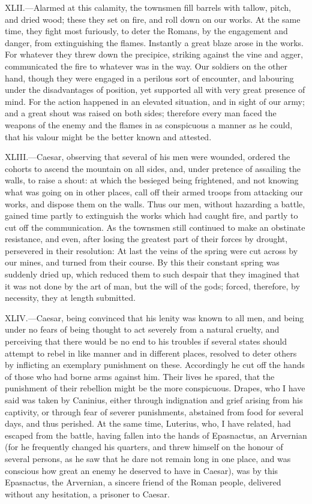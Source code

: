 XLII.—Alarmed at this calamity, the townsmen fill barrels with tallow,
pitch, and dried wood; these they set on fire, and roll down on our
works. At the same time, they fight most furiously, to deter the Romans,
by the engagement and danger, from extinguishing the flames. Instantly a
great blaze arose in the works. For whatever they threw down the
precipice, striking against the vine and agger, communicated the fire to
whatever was in the way. Our soldiers on the other hand, though they
were engaged in a perilous sort of encounter, and labouring under the
disadvantages of position, yet supported all with very great presence of
mind. For the action happened in an elevated situation, and in sight of
our army; and a great shout was raised on both sides; therefore every
man faced the weapons of the enemy and the flames in as conspicuous a
manner as he could, that his valour might be the better known and
attested.

XLIII.—Caesar, observing that several of his men were wounded, ordered
the cohorts to ascend the mountain on all sides, and, under pretence of
assailing the walls, to raise a shout: at which the besieged being
frightened, and not knowing what was going on in other places, call off
their armed troops from attacking our works, and dispose them on the
walls. Thus our men, without hazarding a battle, gained time partly to
extinguish the works which had caught fire, and partly to cut off the
communication. As the townsmen still continued to make an obstinate
resistance, and even, after losing the greatest part of their forces by
drought, persevered in their resolution: At last the veins of the spring
were cut across by our mines, and turned from their course. By this
their constant spring was suddenly dried up, which reduced them to such
despair that they imagined that it was not done by the art of man, but
the will of the gods; forced, therefore, by necessity, they at length
submitted.

XLIV.—Caesar, being convinced that his lenity was known to all men, and
being under no fears of being thought to act severely from a natural
cruelty, and perceiving that there would be no end to his troubles if
several states should attempt to rebel in like manner and in different
places, resolved to deter others by inflicting an exemplary punishment
on these. Accordingly he cut off the hands of those who had borne arms
against him. Their lives he spared, that the punishment of their
rebellion might be the more conspicuous. Drapes, who I have said was
taken by Caninius, either through indignation and grief arising from his
captivity, or through fear of severer punishments, abstained from food
for several days, and thus perished. At the same time, Luterius, who, I
have related, had escaped from the battle, having fallen into the hands
of Epasnactus, an Arvernian (for he frequently changed his quarters, and
threw himself on the honour of several persons, as he saw that he dare
not remain long in one place, and was conscious how great an enemy he
deserved to have in Caesar), was by this Epasnactus, the Arvernian, a
sincere friend of the Roman people, delivered without any hesitation, a
prisoner to Caesar.


